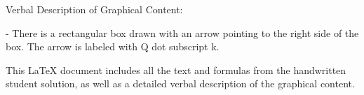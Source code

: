 Verbal Description of Graphical Content:

- There is a rectangular box drawn with an arrow pointing to the right side of the box. The arrow is labeled with Q dot subscript k.

This LaTeX document includes all the text and formulas from the handwritten student solution, as well as a detailed verbal description of the graphical content.